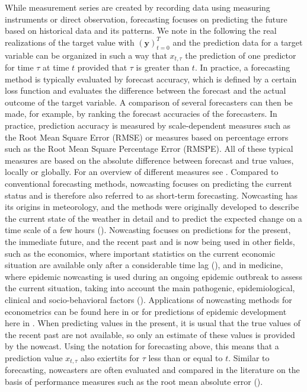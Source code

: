 While measurement series are created by recording data using measuring instruments or direct observation, forecasting focuses on predicting the future based on historical data and its patterns. We note in the following the real realizations of the target value with $(\mathbf{y})^T_{t=0}$ and the prediction data for a target variable can be organized in such a way that $x_{t,\tau}$ the prediction of one predictor for time $\tau$ at time $t$ provided that $\tau$ is greater than $t$. 
In practice, a forecasting method is typically evaluated by forecast accuracy, which is defined by a certain loss function and evaluates the difference between the forecast and the actual outcome of the target variable.
A comparison of several forecasters can then be made, for example, by ranking the forecast accuracies of the forecasters.
In practice, prediction accuracy is measured by scale-dependent measures such as the Root Mean Square Error (RMSE) or measures based on percentage errors such as the Root Mean Square Percentage Error (RMSPE). All of these typical measures are based on the absolute difference between forecast and true values, locally or globally. For an overview of different measures see \cite{hyndman2006another}. Compared to conventional forecasting methods, nowcasting focuses on predicting the current status and is therefore also referred to as short-term forecasting. Nowcasting  has its origins in meteorology, and the methods were originally developed to describe the current state of the weather in detail and to predict the expected change on a time scale of a few hours (\cite{browning1989nowcasting,schmid2019nowcasting}).
Nowcasting focuses on predictions for the present, the immediate future, and the recent past and is now being used in other fields, such as the economics, where important statistics on the current economic situation are available only after a considerable time lag (\cite{banbura2013now}), and in medicine, where epidemic nowcasting is used during an ongoing epidemic outbreak to assess the current situation, taking into account the main pathogenic, epidemiological, clinical and socio-behavioral factors (\cite{wu2021nowcasting}). 
Applications of nowcasting methods for econometrics can be found here in \cite{giannone2006nowcasting,fornaro2020nowcasting,bok2018macroeconomic} or for predictions of epidemic development here in \cite{johansson2014nowcasting,gunther2021nowcasting,birrell2021real}. 
When predicting values in the present, it is usual that the true values of the recent past are not available, so only an estimate of these values is provided by the nowcast.
Using the notation for forecasting above, this means that a prediction value $x_{t,\tau}$ also exiertits  for $\tau$ less than or equal to $t$.
Similar to forecasting, nowcasters are often evaluated and compared in the literature on the basis of performance measures such as the root mean absolute error (\cite{gunther2021nowcasting}).

